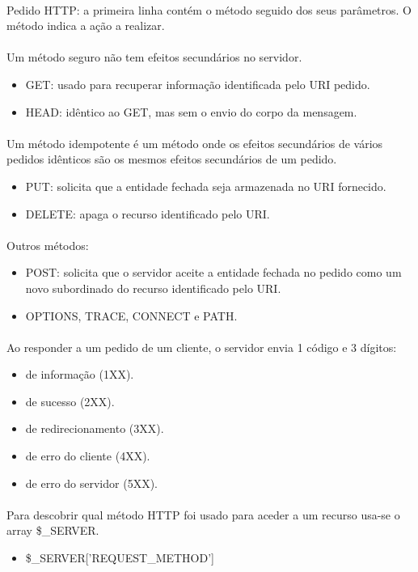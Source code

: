 \documentclass[../resumosLTW.tex]{subfiles}
\begin{document}
\paragraph{}

Pedido HTTP: a primeira linha contém o método seguido dos seus parâmetros.
O método indica a ação a realizar.

\paragraph{}


Um método seguro não tem efeitos secundários no servidor.
\begin{itemize}
    \item GET: usado para recuperar informação identificada pelo URI pedido.
    \item HEAD: idêntico ao GET, mas sem o envio do corpo da mensagem.
\end{itemize}

\paragraph{}

Um método idempotente é um método onde os efeitos secundários de vários pedidos idênticos são os mesmos efeitos secundários de um pedido.
\begin{itemize}
    \item PUT: solicita que a entidade fechada seja armazenada no URI fornecido.
    \item DELETE: apaga o recurso identificado pelo URI.
\end{itemize}

\paragraph{}

Outros métodos:
\begin{itemize}
    \item POST: solicita que o servidor aceite a entidade fechada no pedido como um novo subordinado do recurso identificado pelo URI.
    \item OPTIONS, TRACE, CONNECT e PATH.
\end{itemize}

\paragraph{}

Ao responder a um pedido de um cliente, o servidor envia 1 código e 3 dígitos:
\begin{itemize}
    \item de informação (1XX).
    \item de sucesso (2XX).
    \item de redirecionamento (3XX).
    \item de erro do cliente (4XX).
    \item de erro do servidor (5XX).
\end{itemize}

\paragraph{}

Para descobrir qual método HTTP foi usado para aceder a um recurso usa-se o array \$\_SERVER.
\begin{itemize}
    \item \$\_SERVER['REQUEST\_METHOD']
\end{itemize}
\end{document}

